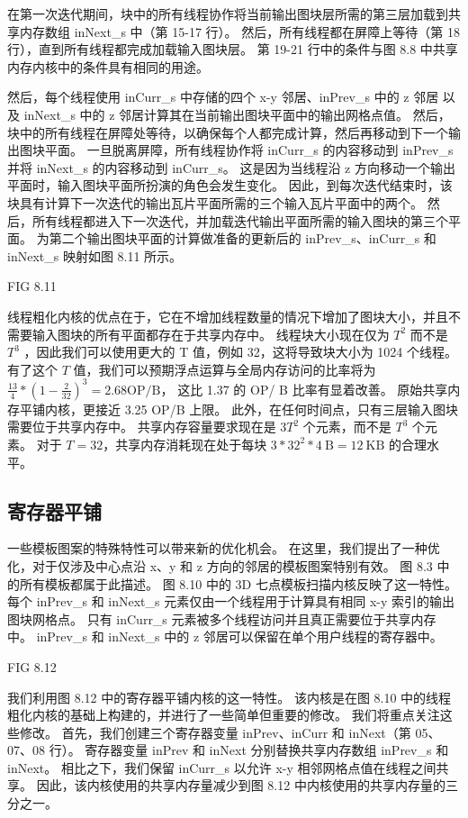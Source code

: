 在第一次迭代期间，块中的所有线程协作将当前输出图块层所需的第三层加载到共享内存数组 inNext\_s 中（第 15-17 行）。 
然后，所有线程都在屏障上等待（第 18 行），直到所有线程都完成加载输入图块层。 
第 19-21 行中的条件与图 8.8 中共享内存内核中的条件具有相同的用途。

然后，每个线程使用 inCurr\_s 中存储的四个 x-y 邻居、inPrev\_s 中的 z 邻居
以及 inNext\_s 中的 z 邻居计算其在当前输出图块平面中的输出网格点值。 
然后，块中的所有线程在屏障处等待，以确保每个人都完成计算，然后再移动到下一个输出图块平面。 
一旦脱离屏障，所有线程协作将 inCurr\_s 的内容移动到 inPrev\_s 并将 inNext\_s 的内容移动到 inCurr\_s。 
这是因为当线程沿 z 方向移动一个输出平面时，输入图块平面所扮演的角色会发生变化。 
因此，到每次迭代结束时，该块具有计算下一次迭代的输出瓦片平面所需的三个输入瓦片平面中的两个。 
然后，所有线程都进入下一次迭代，并加载迭代输出平面所需的输入图块的第三个平面。 
为第二个输出图块平面的计算做准备的更新后的 inPrev\_s、inCurr\_s 和 inNext\_s 映射如图 8.11 所示。

{\color{red} FIG 8.11}

线程粗化内核的优点在于，它在不增加线程数量的情况下增加了图块大小，并且不需要输入图块的所有平面都存在于共享内存中。 
线程块大小现在仅为 $T^2$ 而不是 $T^3$ ，因此我们可以使用更大的 T 值，例如 32，这将导致块大小为 1024 个线程。 
有了这个 $T$ 值，我们可以预期浮点运算与全局内存访问的比率将为 
$\frac{13}{4} *\left(1-\frac{2}{32}\right)^{3}=2.68 \mathrm{OP} / \mathrm{B}$，
这比 1.37 的 OP/ B 比率有显着改善。 原始共享内存平铺内核，更接近 3.25 OP/B 上限。 
此外，在任何时间点，只有三层输入图块需要位于共享内存中。 共享内存容量要求现在是 $3T^2$ 个元素，而不是 $T^3$ 个元素。 
对于 $T = 32$，共享内存消耗现在处于每块 $3 * 32^{2} * 4 \mathrm{~B}=12 \mathrm{~KB}$ 的合理水平。

\subsection{寄存器平铺}
一些模板图案的特殊特性可以带来新的优化机会。 
在这里，我们提出了一种优化，对于仅涉及中心点沿 x、y 和 z 方向的邻居的模板图案特别有效。 
图 8.3 中的所有模板都属于此描述。 图 8.10 中的 3D 七点模板扫描内核反映了这一特性。 
每个 inPrev\_s 和 inNext\_s 元素仅由一个线程用于计算具有相同 x-y 索引的输出图块网格点。 
只有 inCurr\_s 元素被多个线程访问并且真正需要位于共享内存中。 
inPrev\_s 和 inNext\_s 中的 z 邻居可以保留在单个用户线程的寄存器中。

{\color{red} FIG 8.12}

我们利用图 8.12 中的寄存器平铺内核的这一特性。 
该内核是在图 8.10 中的线程粗化内核的基础上构建的，并进行了一些简单但重要的修改。 我们将重点关注这些修改。 
首先，我们创建三个寄存器变量 inPrev、inCurr 和 inNext（第 05、07、08 行）。 
寄存器变量 inPrev 和 inNext 分别替换共享内存数组 inPrev\_s 和 inNext。 
相比之下，我们保留 inCurr\_s 以允许 x-y 相邻网格点值在线程之间共享。 
因此，该内核使用的共享内存量减少到图 8.12 中内核使用的共享内存量的三分之一。

